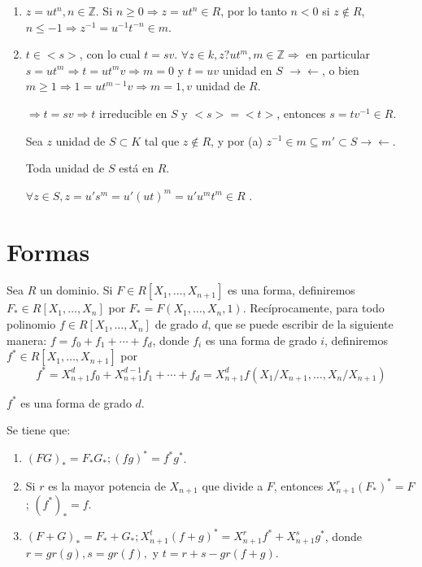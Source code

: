 \begin{enumerate}
\item $z=ut^n, n\in \mathbb{Z}$. Si $n\ge 0 \Rightarrow z=ut^n\in R$, por lo tanto $n<0$ si $z\notin R$, $n\le -1 \Rightarrow z^{-1}=u^{-1}t^{-n}\in m$.

\item $t\in <s>$, con lo cual $t=sv$. $\forall z \in k, z?ut^m,m\in \mathbb{Z} \Rightarrow $ en particular $s=ut^m \Rightarrow t=ut^mv \Rightarrow m=0$ y $t=uv$ unidad en $S$ $ \rightarrow\leftarrow$, o bien $m\ge 1 \Rightarrow 1=ut^{m-1}v\Rightarrow m=1, v$ unidad de $R$. 

$\Rightarrow t=sv \Rightarrow t$ irreducible en $S$ y $<s>=<t>$, entonces $s=tv^{-1}\in R$. 

Sea $z$ unidad de $S\subset K$ tal que $z\notin R$, y por (a) $z^{-1}\in m \subseteq m' \subset S \rightarrow \leftarrow$.

Toda unidad de $S$ está en $R$. 

$\forall z\in S, z=u's^m=u'(ut)^m=u'u^mt^m\in R$ .

\end{enumerate}
\section{Formas}

Sea $R$ un dominio. Si $F\in R[X_1,\dots,X_{n+1}]$ es una forma, definiremos $F_*\in R[X_1,\dots,X_n]$ por $F_*=F(X_1,\dots,X_n,1)$. Recíprocamente, para todo polinomio $f\in R[X_1,\dots,X_n]$ de grado $d$, que se puede escribir de la siguiente manera: $f=f_0+f_1+\cdots+f_d$, donde $f_i$ es una forma de grado $i$, definiremos $f^*\in R[X_1,\dots,X_{n+1}]$ por
$$f^*=X^d_{n+1}f_0+X^{d-1}_{n+1}f_1+\cdots + f_d= X^d_{n+1}f(X_1/X_{n+1},\dots,X_n/X_{n+1})$$

$f^*$ es una forma de grado $d$.

\begin{Prop}
  Se tiene que:

  
  \begin{enumerate}
  \item $(FG)_*=F_*G_*; (fg)^*=f^*g^*$.
  \item Si $r$ es la mayor potencia de $X_{n+1}$ que divide a $F$, entonces $X^r_{n+1}(F_*)^*=F$; $(f^*)_*=f$.
  \item $(F+G)_*=F_*+G_*; X^t_{n+1}(f+g)^*=X^r_{n+1}f^*+X^s_{n+1}g^*$, donde $r=gr(g), s=gr(f),$ y $t=r+s-gr(f+g)$.
  \end{enumerate}
\end{Prop}

